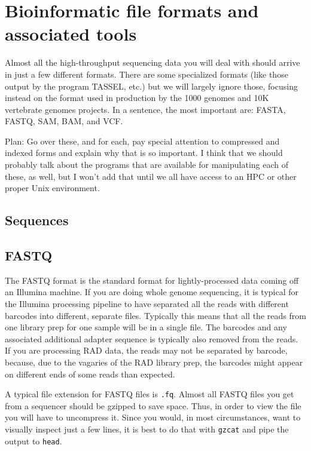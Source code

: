 \documentclass[]{krantz}
\begin{document}
\hypertarget{bioinformatic-file-formats-and-associated-tools}{%
\chapter{Bioinformatic file formats and associated tools}\label{bioinformatic-file-formats-and-associated-tools}}

Almost all the high-throughput sequencing data you will deal with should
arrive in just a few different formats. There are some specialized formats
(like those output by the program TASSEL, etc.) but we will largely ignore
those, focusing instead on the format used in production by the 1000 genomes
and 10K vertebrate genomes projects. In a sentence, the most important are:
FASTA, FASTQ, SAM, BAM, and VCF.

Plan: Go over these, and for each, pay special attention to compressed and indexed
forms and explain why that is so important. I think that we should probably
talk about the programs that are available for manipulating each of these, as well,
but I won't add that until we all have access to an HPC or other proper
Unix environment.

\hypertarget{sequences}{%
\section{Sequences}\label{sequences}}

\hypertarget{fastq}{%
\section{FASTQ}\label{fastq}}

The FASTQ format is the standard format for lightly-processed data
coming off an Illumina machine. If you are doing whole genome sequencing,
it is typical for the Illumina processing pipeline to have separated all
the reads with different barcodes into different, separate files. Typically
this means that all the reads from one library prep for one sample will
be in a single file. The barcodes and any associated additional adapter
sequence is typically also removed from the reads. If you are processing
RAD data, the reads may not be separated by barcode, because, due to the
vagaries of the RAD library prep, the barcodes might appear on different ends
of some reads than expected.

A typical file extension for FASTQ files is \texttt{.fq}.
Almost all FASTQ files you get from a sequencer should be gzipped to save space.
Thus, in order to view the file you will have to uncompress it. Since you would,
in most circumstances, want to visually inspect just a few lines, it is best
to do that with \texttt{gzcat} and pipe the output to \texttt{head}.
\end{document}
